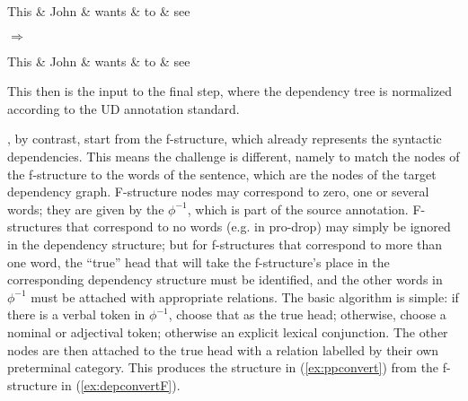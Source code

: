 \documentclass[output=paper,hidelinks]{langscibook}
\begin{document}
\begin{exe}
  \ex\label{ex:meurerconvert}
  \begin{minipage}{0.4\textwidth}
  \begin{dependency}[baseline=-0.6ex,theme=simple]
    \begin{deptext}
      This \& John \& wants \& to \& see\\
    \end{deptext}
  \end{dependency}
  \end{minipage}
  \begin{minipage}{0.1\textwidth}
    $\Rightarrow$
  \end{minipage}
  \begin{minipage}{0.4\textwidth}
  \begin{dependency}[baseline=-0.6ex,theme=simple]
    \begin{deptext}
      This \& John \& wants \& to \& see\\
    \end{deptext}
  \end{dependency}
  \end{minipage}
\end{exe}
%
This then is the input to the final step, where the dependency tree is
normalized according to the UD annotation standard.

\largerpage
\citet{prz:pat:19:lre}, by contrast, start from the f-structure, which
already represents the syntactic dependencies. This means the
challenge is different, namely to match the nodes of the f-structure
to the words of the sentence, which are the nodes of the target
dependency graph. F-structure nodes may correspond to zero, one or
several words; they are given by the $\phi^{-1}$, which is part of the
source annotation. F-structures that correspond to no words (e.g. in
pro-drop) may simply be ignored in the dependency structure; but for
f-structures that correspond to more than one word, the ``true'' head
that will take the f-structure's place in the corresponding dependency
structure must be identified, and the other words in $\phi^{-1}$ must
be attached with appropriate relations. The basic algorithm is simple:
if there is a verbal token in $\phi^{-1}$, choose that as the true
head; otherwise, choose a nominal or adjectival token; otherwise an
explicit lexical conjunction. The other nodes are then attached to the
true head with a relation labelled by their own preterminal
category. This produces the structure in (\ref{ex:ppconvert}) from the f-structure in
(\ref{ex:depconvertF}).
\end{document}
